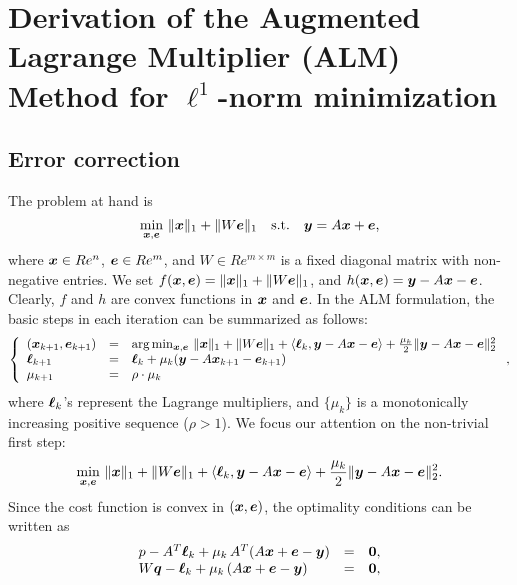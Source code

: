 \section{Derivation of the Augmented Lagrange Multiplier (ALM) Method for $\ell^1$-norm minimization}

\newcommand{\sgn}{\mathrm{sign}}

\subsection{Error correction}

The problem at hand is 
\begin{equation}
\min_{{\boldsymbol{x}},\boldsymbol{e}} \, \|{\boldsymbol{x}}\|_1 + \|W\boldsymbol{e}\|_1 \quad \mathrm{s.t.} \quad {\boldsymbol{y}} = A{\boldsymbol{x}} + \boldsymbol{e},
\end{equation}
where ${\boldsymbol{x}} \in Re^n$, $\boldsymbol{e} \in Re^m$, and $W \in Re^{m \times m}$ is a fixed diagonal matrix with non-negative entries. 
\smallbreak
We set $f({\boldsymbol{x}},\boldsymbol{e}) = \|{\boldsymbol{x}}\|_1 + \|W\boldsymbol{e}\|_1$, and $h({\boldsymbol{x}},\boldsymbol{e}) = {\boldsymbol{y}} - A{\boldsymbol{x}} - \boldsymbol{e}$. Clearly, $f$ and $h$ are convex functions in ${\boldsymbol{x}}$ and $\boldsymbol{e}$. In the ALM formulation, the basic steps in each iteration can be summarized as follows:
\begin{equation}
\left \{ 
\begin{array}{lll}
({\boldsymbol{x}}_{k+1},\boldsymbol{e}_{k+1}) & = & \arg\min_{{\boldsymbol{x}},\boldsymbol{e}} \, \|{\boldsymbol{x}}\|_1 + \|W\boldsymbol{e}\|_1 + \langle {\boldsymbol\ell}_k, {\boldsymbol{y}} - A{\boldsymbol{x}} - \boldsymbol{e} \rangle + \frac{\mu_k}{2}\|{\boldsymbol{y}} - A{\boldsymbol{x}} - \boldsymbol{e}\|_2^2 \\
{\boldsymbol \ell}_{k+1} & = & {\boldsymbol \ell}_k + \mu_k ({\boldsymbol{y}} - A{\boldsymbol{x}}_{k+1} - \boldsymbol{e}_{k+1}) \\
\mu_{k+1} & = & \rho\cdot\mu_k
\end{array} 
\right . ,
\end{equation}
where ${\boldsymbol \ell}_k$'s represent the Lagrange multipliers, and $\{\mu_k\}$ is a monotonically increasing positive sequence ($\rho > 1$).
\smallbreak
We focus our attention on the non-trivial first step:
\begin{equation}
\min_{\x,\e} \, \|\x\|_1 + \|W\e\|_1 + \langle \bl_k, \y - A\x - \e \rangle + \frac{\mu_k}{2}\|\y - A\x - \e\|_2^2.
\label{eqn:alm}
\end{equation}
Since the cost function is convex in $({\boldsymbol{x}},\boldsymbol{e})$, the optimality conditions can be written as
\begin{equation}
\begin{array}{lll}
{p} - A^T{\boldsymbol \ell}_k + \mu_k\,A^T(A{\boldsymbol{x}} + \boldsymbol{e} - {\boldsymbol{y}}) & = & \boldsymbol{0}, \\
W{\boldsymbol q} - {\boldsymbol \ell}_k + \mu_k\, (A{\boldsymbol{x}} + \boldsymbol{e} -{\boldsymbol{y}}) & = & \boldsymbol{0},
\end{array}
\end{equation}
